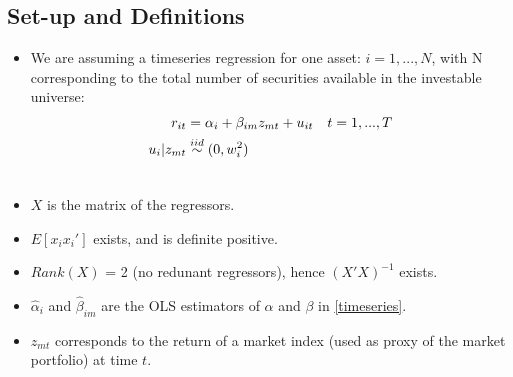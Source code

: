 \documentclass[12pt]{article}
\begin{document}
	\subsection{Set-up and Definitions}
	\begin{itemize}
		\item We are assuming a timeseries regression for one asset: $i=1,...,N$, with N corresponding to the total number of securities available in the investable universe:
			\begin{align} \label{timeseries}
				r_{it} &= \alpha_i + \beta_{im} z_{mt} + u_{it} \quad t = 1,...,T \\ 
				u_i|z_{mt} &\overset{iid}{\sim} (0, w_{i}^2) \notag \\ \notag
			\end{align} \vspace{-3em}
		\item $X$ is the matrix of the regressors.	
		\item $E[x_ix_i']$ exists, and is definite positive.	
		\item ${Rank}(X)$ = 2 (no redunant regressors), hence $(X'X)^{-1}$ exists.	
		\item $\hat{\alpha}_i$ and $\hat{\beta}_{im}$ are the OLS estimators of $\alpha$ and $\beta$ in \ref{timeseries}.
		\item $z_{mt}$ corresponds to the return of a market index (used as proxy of the market portfolio) at time $t$. 
	\end{itemize}
\end{document}
